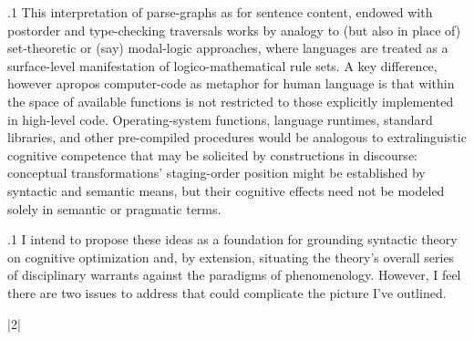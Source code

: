 \documentclass[11pt, twocolumn]{article}
\begin{document}
\p.1{%
\:\+This interpretation of parse-graphs \mdash{} as
 for sentence content,
endowed with post\-order and type-checking traversals
 \mdash{} works by analogy to
(but also in place of) set-theoretic or (say) modal-logic
approaches, where languages are treated as a surface-level
manifestation of logico-mathematical rule sets. \>  A key difference,
however \mdash{} apropos computer-code as metaphor for human
language \mdash{} is that within  the space
of available functions is not restricted to those explicitly
implemented in high-level code. \>  Operating-system functions,
language runtimes, standard libraries, and other
pre-compiled procedures would be analogous to extralinguistic
cognitive competence that may be solicited by constructions
in discourse: conceptual transformations' staging-order position
might be established by syntactic and
semantic means, but their cognitive effects need not be
modeled solely in semantic or pragmatic terms.\<\;
}%

\p.1{%
\:\+I intend to propose these ideas as a foundation for
grounding syntactic theory on cognitive optimization
\mdash{} and, by extension, situating the theory's overall
series of disciplinary warrants against the paradigms
of phenomenology. \>  However, I feel there are two
issues to address that could complicate the picture
I've outlined.\upAdj{19pt}\<\;
}%


\s|2|{}
\end{document}
